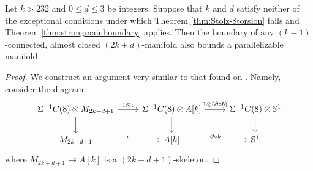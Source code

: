 \begin{thm} \label{thm:weakmainboundary}
Let $k>232$ and $0 \le d \le 3$ be integers.  Suppose that $k$ and $d$ satisfy neither of the exceptional conditions under which Theorem \ref{thm:Stolz-8torsion} fails and Theorem \ref{thm:strongmainboundary} applies.  Then the boundary of any $(k-1)$-connected, almost closed $(2k+d)$-manifold also bounds a parallelizable manifold. 
\end{thm}

\begin{proof}
We construct an argument very similar to that found on \cite[p.107]{StolzBook}.  Namely, consider the diagram
    \[
\begin{tikzcd}
    \Sigma^{-1} C(8) \otimes M_{2k+d+1} \arrow{r}{1 \otimes \iota} \arrow{d} & \Sigma^{-1}C(8) \otimes A[k] \arrow{r}{1 \otimes (\partial \circ b)} \arrow{d} & \Sigma^{-1}C(8) \otimes \mathbb{S}^1 \arrow{d} \\   
    M_{2k+d+1} \arrow{r}{\iota} & A[k] \arrow{r}{\partial \circ b} &  \mathbb{S}^1
\end{tikzcd}
    \]
    where $M_{2k+d+1} \to A[k]$ is a $(2k+d+1)$-skeleton.


\end{proof}
